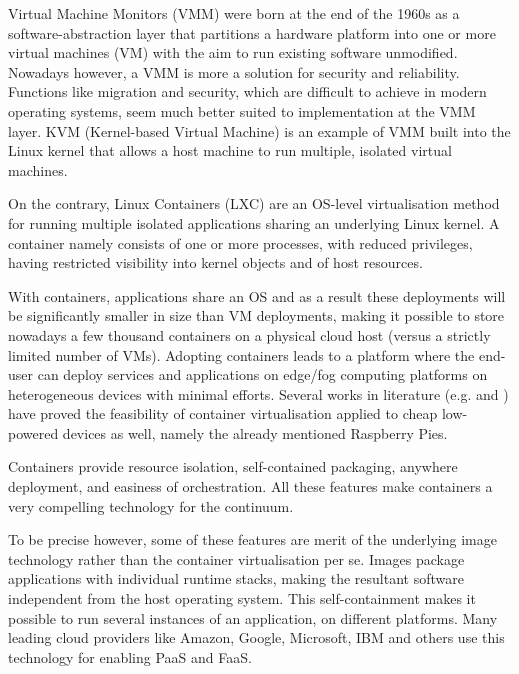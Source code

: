 \documentclass{ieeeaccess}
\begin{document}
Virtual Machine Monitors (VMM) \cite{vmm} were born at the end of the 1960s as a software-abstraction layer that partitions a hardware platform into one or more virtual machines (VM) with the aim to run existing software unmodified. Nowadays however, a VMM is more a solution for security and reliability. Functions like migration and security, which are difficult to achieve in modern operating systems, seem much better suited to implementation at the VMM layer. KVM (Kernel-based Virtual Machine) \cite{kvm} is an example of VMM built into the Linux kernel that allows a host machine to run multiple, isolated virtual machines. 

On the contrary, Linux Containers (LXC) \cite{containers} are an OS-level virtualisation method for running multiple isolated applications sharing an underlying Linux kernel. A container namely consists of one or more processes, with reduced privileges, having restricted visibility into kernel objects and of host resources.

With containers, applications share an OS and as a result these deployments will be significantly smaller in size than VM deployments, making it possible to store nowadays a few thousand containers on a physical cloud host (versus a strictly limited number of VMs). Adopting containers leads to a platform where the end-user can deploy services and applications on edge/fog computing platforms on heterogeneous devices with minimal efforts. Several works in literature (e.g. \cite{containers-raspberry} and \cite{containers-fog}) have proved the feasibility of container virtualisation applied to cheap low-powered devices as well, namely the already mentioned Raspberry Pies.

Containers provide resource isolation, self-contained packaging, anywhere deployment, and easiness of orchestration. All these features make containers a very compelling technology for the continuum.

To be precise however, some of these features are merit of the underlying image technology rather than the container virtualisation per se. Images package applications with individual runtime stacks, making the resultant software independent from the host operating system. This self-containment makes it possible to run several instances of an application, on different platforms. Many leading cloud providers like Amazon, Google, Microsoft, IBM and others use this technology for enabling PaaS and FaaS.
\end{document}
